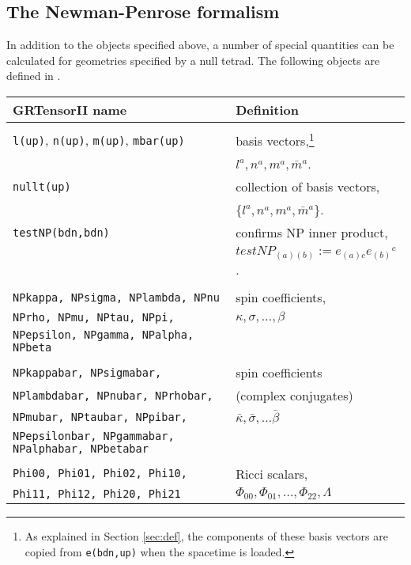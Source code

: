 \documentclass{article}
\begin{document}
\subsection*{The Newman-Penrose formalism}\label{sec:NP}
%
In addition to the objects specified above, a number of special
quantities can be calculated for geometries specified by a null
tetrad. The following objects are defined in
\cite{newman/penrose:1962}.\\

\begin{longtable}[c]{p{}p{}}\hline\hline
GRTensorII name & Definition\\ \hline
& \\
\texttt{l(up)}, \texttt{n(up)}, \texttt{m(up)}, \texttt{mbar(up)}
				& basis vectors,\footnote{As explained
				in Section \ref{sec:def}, the components
				of these basis vectors are copied from
				\texttt{e(bdn,up)} when the spacetime is
				loaded.}\\
				& $l^a, n^a, m^a, \bar{m}^a$. \\
\texttt{nullt(up)}			& collection of basis vectors, \\
				& $\{ l^a, n^a, m^a, \bar{m}^a \}$. \\
\texttt{testNP(bdn,bdn)}	& confirms NP inner product, \\
				& $testNP_{(a)(b)} := e_{(a)c}e_{(b)}{}^c$.\\
& \\
\texttt{NPkappa, NPsigma, NPlambda, NPnu} & spin coefficients, \\
\texttt{NPrho, NPmu, NPtau, NPpi,} & $\kappa, \sigma, \ldots, \beta$\\
\texttt{NPepsilon, NPgamma, NPalpha, NPbeta} & \\
& \\
\texttt{NPkappabar, NPsigmabar,} & spin coefficients\\
\texttt{NPlambdabar, NPnubar, NPrhobar,} & (complex conjugates) \\
\texttt{NPmubar, NPtaubar, NPpibar,} & $\bar{\kappa}, \bar{\sigma},
				\ldots \bar{\beta}$ \\
\texttt{NPepsilonbar, NPgammabar, NPalphabar, NPbetabar} & \\
& \\
\texttt{Phi00, Phi01, Phi02, Phi10,} & Ricci scalars, \\
\texttt{Phi11, Phi12, Phi20, Phi21}  & $\Phi_{00}, \Phi_{01}, \ldots,
				  \Phi_{22}, \Lambda$ \\

\end{longtable}
\end{document}
